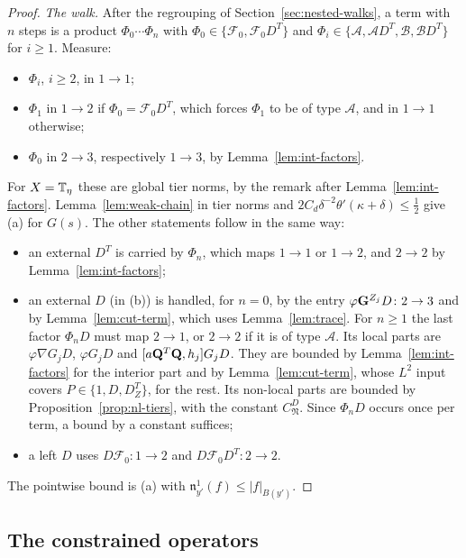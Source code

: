 \begin{proof}
\emph{The walk.} After the regrouping of Section~\ref{sec:nested-walks}, a term with $n$ steps is a product $\Phi_0\cdots\Phi_n$ with $\Phi_0\in\{\mathcal F_0,\mathcal F_0D^T\}$ and $\Phi_i\in\{\mathcal A,\mathcal AD^T,\mathcal B,\mathcal BD^T\}$ for $i\ge1$. Measure:
\begin{itemize}
\item $\Phi_i$, $i\ge2$, in $1\to1$;
\item $\Phi_1$ in $1\to2$ if $\Phi_0=\mathcal F_0D^T$, which forces $\Phi_1$ to be of type $\mathcal A$, and in $1\to1$ otherwise;
\item $\Phi_0$ in $2\to3$, respectively $1\to3$, by Lemma~\ref{lem:int-factors}.
\end{itemize}
For $X=\mathbb T_\eta$ these are global tier norms, by the remark after Lemma~\ref{lem:int-factors}. Lemma~\ref{lem:weak-chain} in tier norms and $2C_d\delta^{-2}\theta'(\kappa+\delta)\le\frac12$ give (a) for $G(s)$. The other statements follow in the same way:
\begin{itemize}
\item an external $D^T$ is carried by $\Phi_n$, which maps $1\to1$ or $1\to2$, and $2\to2$ by Lemma~\ref{lem:int-factors};
\item an external $D$ (in (b)) is handled, for $n=0$, by the entry $\varphi\mathbf G^{Z_j}D\colon2\to3$ and by Lemma~\ref{lem:cut-term}, which uses Lemma~\ref{lem:trace}. For $n\ge1$ the last factor $\Phi_nD$ must map $2\to1$, or $2\to2$ if it is of type $\mathcal A$. Its local parts are $\varphi\nabla G_jD$, $\varphi G_jD$ and $[a\mathbf Q^T\mathbf Q,h_j]G_jD$. They are bounded by Lemma~\ref{lem:int-factors} for the interior part and by Lemma~\ref{lem:cut-term}, whose $L^2$ input covers $P\in\{1,D,D^T_Z\}$, for the rest. Its non-local parts are bounded by Proposition~\ref{prop:nl-tiers}, with the constant $C^D_{\mathfrak N}$. Since $\Phi_nD$ occurs once per term, a bound by a constant suffices;
\item a left $D$ uses $D\mathcal F_0\colon1\to2$ and $D\mathcal F_0D^T\colon2\to2$.
\end{itemize}
The pointwise bound is (a) with $\mathfrak n^1_{y'}(f)\le|f|_{B(y')}$.
\end{proof}

\subsection{The constrained operators}\label{ss:44.5}

